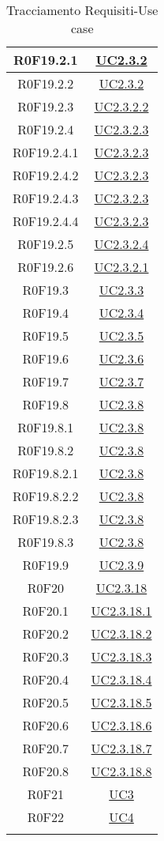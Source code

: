 \documentclass[../AnalisiDeiRequisiti.tex]{subfiles}
\begin{document}
\begin{longtable}{|c|c|}
	R0F19.2.1 & \hyperlink{UC2.3.2}{UC2.3.2}\\\hline
	R0F19.2.2 & \hyperlink{UC2.3.2}{UC2.3.2}\\\hline
	R0F19.2.3 & \hyperlink{UC2.3.2.2}{UC2.3.2.2}\\\hline
	R0F19.2.4 & \hyperlink{UC2.3.2.3}{UC2.3.2.3}\\\hline
	R0F19.2.4.1 & \hyperlink{UC2.3.2.3}{UC2.3.2.3}\\\hline
	R0F19.2.4.2 & \hyperlink{UC2.3.2.3}{UC2.3.2.3}\\\hline
	R0F19.2.4.3 & \hyperlink{UC2.3.2.3}{UC2.3.2.3}\\\hline
	R0F19.2.4.4 & \hyperlink{UC2.3.2.3}{UC2.3.2.3}\\\hline
	R0F19.2.5 & \hyperlink{UC2.3.2.4}{UC2.3.2.4}\\\hline
	R0F19.2.6 & \hyperlink{UC2.3.2.1}{UC2.3.2.1}\\\hline
	R0F19.3 & \hyperlink{UC2.3.3}{UC2.3.3}\\\hline
	R0F19.4 & \hyperlink{UC2.3.4}{UC2.3.4}\\\hline
	R0F19.5 & \hyperlink{UC2.3.5}{UC2.3.5}\\\hline
	R0F19.6 & \hyperlink{UC2.3.6}{UC2.3.6}\\\hline
	R0F19.7 & \hyperlink{UC2.3.7}{UC2.3.7}\\\hline
	R0F19.8 & \hyperlink{UC2.3.8}{UC2.3.8}\\\hline
	R0F19.8.1 & \hyperlink{UC2.3.8}{UC2.3.8}\\\hline
	R0F19.8.2 & \hyperlink{UC2.3.8}{UC2.3.8}\\\hline
	R0F19.8.2.1 & \hyperlink{UC2.3.8}{UC2.3.8}\\\hline
	R0F19.8.2.2 & \hyperlink{UC2.3.8}{UC2.3.8}\\\hline
	R0F19.8.2.3 & \hyperlink{UC2.3.8}{UC2.3.8}\\\hline
	R0F19.8.3 & \hyperlink{UC2.3.8}{UC2.3.8}\\\hline
	R0F19.9 & \hyperlink{UC2.3.9}{UC2.3.9}\\\hline
	R0F20 & \hyperlink{UC2.3.18}{UC2.3.18}\\\hline
	R0F20.1 & \hyperlink{UC2.3.18.1}{UC2.3.18.1}\\\hline
	R0F20.2 & \hyperlink{UC2.3.18.2}{UC2.3.18.2}\\\hline
	R0F20.3 & \hyperlink{UC2.3.18.3}{UC2.3.18.3}\\\hline
	R0F20.4 & \hyperlink{UC2.3.18.4}{UC2.3.18.4}\\\hline
	R0F20.5 & \hyperlink{UC2.3.18.5}{UC2.3.18.5}\\\hline
	R0F20.6 & \hyperlink{UC2.3.18.6}{UC2.3.18.6}\\\hline
	R0F20.7 & \hyperlink{UC2.3.18.7}{UC2.3.18.7}\\\hline
	R0F20.8 & \hyperlink{UC2.3.18.8}{UC2.3.18.8}\\\hline
	R0F21 & \hyperlink{UC3}{UC3}\\\hline
	R0F22 & \hyperlink{UC4}{UC4}\\\hline
	\caption[Tracciamento Requisiti-Use case]{Tracciamento Requisiti-Use case}
	\label{tabella:requi-usecase}
\end{longtable}
\clearpage
\end{document}
